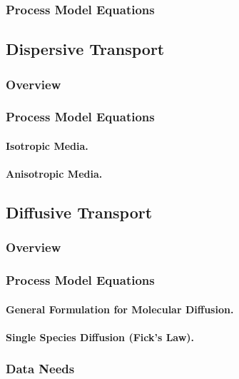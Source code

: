 \subsubsection{Process Model Equations}

\subsection{Dispersive Transport}   
\label{sec:transport-dispersion}

\subsubsection{Overview}

\subsubsection{Process Model Equations}

\paragraph{Isotropic Media.}
\paragraph{Anisotropic Media.}

\subsection{Diffusive Transport} 
\label{sec:diffusive-transport}

\subsubsection{Overview}

\subsubsection{Process Model Equations}

\paragraph{General Formulation for Molecular Diffusion.}

\paragraph{Single Species Diffusion (Fick's Law).}

\subsubsection{Data Needs}

